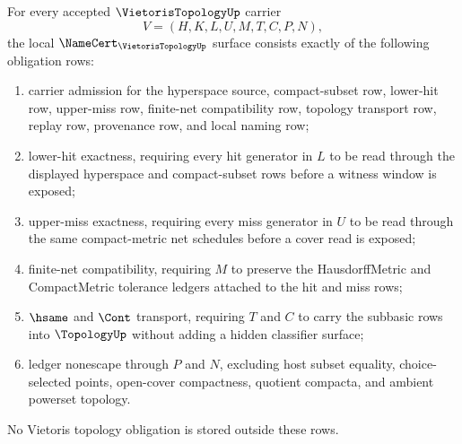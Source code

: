 \begin{theorem}
\label{thm:vietoris-topology-namecert-obligations}
For every accepted $\VietorisTopologyUp$ carrier
$$
V=(H,K,L,U,M,T,C,P,N),
$$
the local $\NameCert_{\VietorisTopologyUp}$ surface consists exactly of the following obligation rows:
\begin{enumerate}
\item carrier admission for the hyperspace source, compact-subset row, lower-hit row, upper-miss row, finite-net compatibility row, topology transport row, replay row, provenance row, and local naming row;
\item lower-hit exactness, requiring every hit generator in $L$ to be read through the displayed hyperspace and compact-subset rows before a witness window is exposed;
\item upper-miss exactness, requiring every miss generator in $U$ to be read through the same compact-metric net schedules before a cover read is exposed;
\item finite-net compatibility, requiring $M$ to preserve the HausdorffMetric and CompactMetric tolerance ledgers attached to the hit and miss rows;
\item $\hsame$ and $\Cont$ transport, requiring $T$ and $C$ to carry the subbasic rows into $\TopologyUp$ without adding a hidden classifier surface;
\item ledger nonescape through $P$ and $N$, excluding host subset equality, choice-selected points, open-cover compactness, quotient compacta, and ambient powerset topology.
\end{enumerate}
No Vietoris topology obligation is stored outside these rows.
\end{theorem}


\begin{closurestatus}{\VietorisTopologyUp}
  \theoryclosure{\seedClosure}
  \formalstatus{\unformalizedV}
\end{closurestatus}
